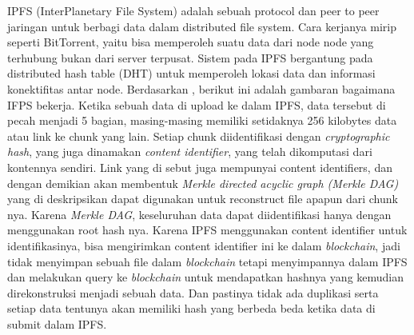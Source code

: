 IPFS (InterPlanetary File System) adalah sebuah protocol dan
peer to peer jaringan untuk berbagi data dalam distributed file system. Cara kerjanya mirip seperti BitTorrent, yaitu bisa memperoleh
suatu data dari node node yang terhubung bukan dari server terpusat. Sistem pada IPFS bergantung pada distributed hash table
(DHT) untuk memperoleh lokasi data dan informasi konektifitas
antar node. Berdasarkan \parencite{Steichen2018}, berikut ini adalah gambaran bagaimana 
IFPS bekerja. Ketika sebuah data di upload ke dalam IPFS, data tersebut
di pecah menjadi 5 bagian, masing-masing memiliki setidaknya
256 kilobytes data atau link ke chunk yang lain. Setiap chunk 
diidentifikasi dengan \emph{cryptographic hash}, yang juga dinamakan \emph{content
identifier}, yang telah dikomputasi dari kontennya sendiri. Link yang
di sebut juga mempunyai content identifiers, dan dengan demikian
akan membentuk \emph{Merkle directed acyclic graph (Merkle DAG)} yang
di deskripsikan dapat digunakan untuk reconstruct file apapun dari 
chunk nya. Karena \emph{Merkle DAG}, keseluruhan data dapat 
diidentifikasi hanya dengan menggunakan root hash nya. Karena IPFS
menggunakan content identifier untuk identifikasinya, bisa 
mengirimkan content identifier ini ke dalam \emph{blockchain}, jadi tidak 
menyimpan sebuah file dalam \emph{blockchain} tetapi menyimpannya dalam
IPFS dan melakukan query ke \emph{blockchain} untuk mendapatkan 
hashnya yang kemudian direkonstruksi menjadi sebuah data. Dan 
pastinya tidak ada duplikasi serta setiap data tentunya akan memiliki
hash yang berbeda beda ketika data di submit dalam IPFS.
